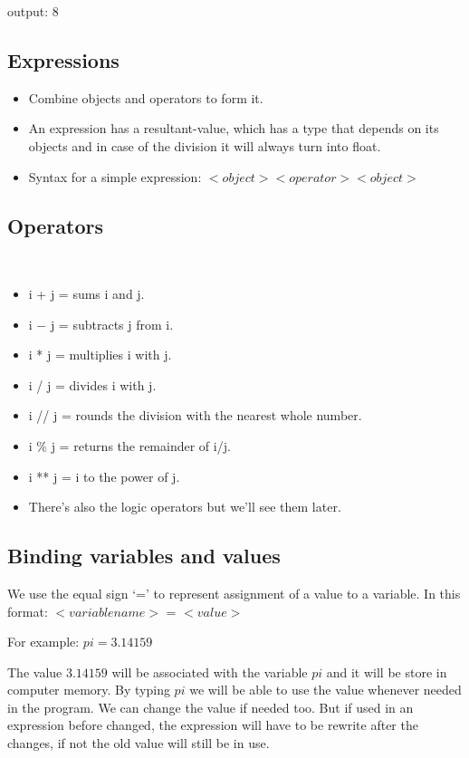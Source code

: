 \documentclass{article}
\begin{document}
{output: 8

\subsection*{Expressions}

\begin{itemize}
    \item Combine objects and operators to form it.
    \item An expression has a resultant-value, which
    has a type that depends on its objects and in case
    of the division it will always turn into float.
    \item Syntax for a simple expression: $<object> 
    <operator> <object>$
\end{itemize}

\subsection{Operators}
\
\begin{itemize}
    \item i + j = sums i and j.
    \item i $-$ j = subtracts j from i.
    \item i * j = multiplies i with j.
    \item i / j = divides i with j.
    \item i // j = rounds the division with the nearest whole number.
    \item i \% j = returns the remainder of i/j.
    \item i ** j = i to the power of j.
    \item There's also the logic operators but we'll see them later.
\end{itemize}

\newpage

\subsection*{Binding variables and values}

We use the equal sign `=' to represent assignment of a value to a variable.
In this format: $ <variablename> $ = $ <value> $

For example: $pi = 3.14159$

The value $3.14159$ will be associated with the variable $pi$ and it will be
store in computer memory. By typing $pi$ we will be able to use the value
whenever needed in the program. We can change the value if needed too.
But if used in an expression before changed, the expression will have
to be rewrite after the changes, if not the old value will still be in use.


}
\end{document}
